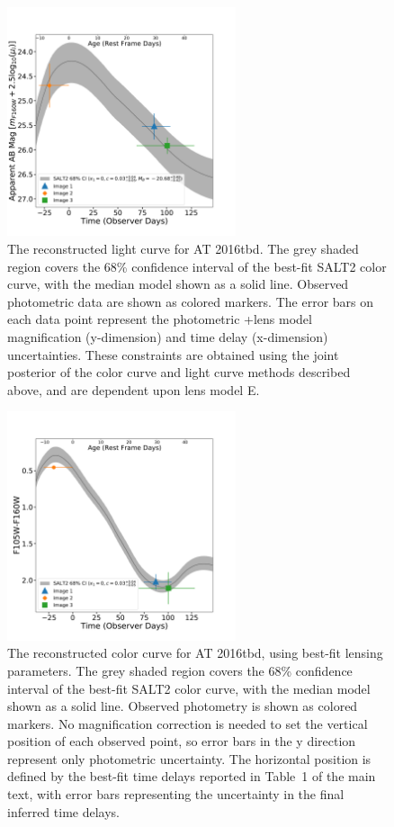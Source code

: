 \documentclass[12pt]{article}
\def\SNABC{AT 2016tbd\xspace}
\begin{document}
\begin{figure}[htp]
    \centering
    \includegraphics[width=0.6\textwidth]{Paper/Figures/full_lightcurve.pdf}
    \caption{\label{fig:full_lightcurve}The reconstructed light curve for \SNABC. The grey shaded region covers the 68\% confidence interval of the best-fit SALT2 color curve, with the median model shown as a solid line. Observed photometric data are shown as colored markers.   The error bars on each data point represent the photometric +lens model magnification (y-dimension) and time delay (x-dimension) uncertainties. These constraints are obtained using the joint posterior of the color curve and light curve methods described above, and are dependent upon lens model E.}
\end{figure}
\begin{figure}[hbp]
    \centering
    \includegraphics[width=0.6\textwidth]{Paper/Figures/full_colorcurve_total.pdf}
    \caption{\label{fig:full_colorcurve} The reconstructed color curve for \SNABC, using best-fit lensing parameters. The grey shaded region covers the 68\% confidence interval of the best-fit SALT2 color curve, with the median model shown as a solid line. Observed photometry is shown as colored markers.  No magnification correction is needed to set the vertical position of each observed point, so error bars in the y direction represent only photometric uncertainty. The horizontal position is defined by the best-fit time delays reported in Table~1 of the main text, with error bars 
    representing the uncertainty in the final inferred time delays. }
\end{figure}
\end{document}

